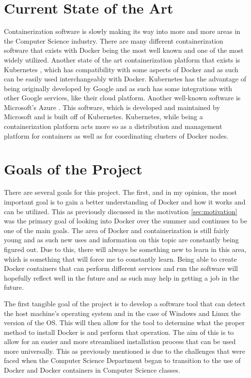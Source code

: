 \section{Current State of the Art}
\label{sec:stateofart}

Containerization software is slowly making its way into more and more areas in the Computer Science industry. There are many different containerization software that exists with Docker being the most well known and one of the most widely utilized. Another state of the art containerization platform that exists is Kubernetes \cite{kubernetes}, which has compatibility with some aspects of Docker and as such can be easily used interchangeably with Docker. Kubernetes has the advantage of being originally developed by Google and as such has some integrations with other Google services, like their cloud platform. Another well-known software is Microsoft's Azure \cite{azure}. This software, which is developed and maintained by Microsoft and is built off of Kubernetes. Kubernetes, while being a containerization platform acts more so as a distribution and management platform for containers as well as for coordinating clusters of Docker nodes.

\section{Goals of the Project}
\label{sec:goals}

There are several goals for this project. The first, and in my opinion, the most important goal is to gain a better understanding of Docker and how it works and can be utilized. This as previously discussed in the motivation \ref{sec:motivation} was the primary goal of looking into Docker over the summer and continues to be one of the main goals. The area of Docker and containerization is still fairly young and as such new uses and information on this topic are constantly being figured out. Due to this, there will always be something new to learn in this area, which is something that will force me to constantly learn. Being able to create Docker containers that can perform different services and run the software will hopefully reflect well in the future and as such may help in getting a job in the future.

The first tangible goal of the project is to develop a software tool that can detect the host machine's operating system and in the case of Windows and Linux the version of the OS. This will then allow for the tool to determine what the proper method to install Docker is and perform that operation. The aim of this is to allow for an easier and more streamlined installation process that can be used more universally. This as previously mentioned is due to the challenges that were faced when the Computer Science Department began to transition to the use of Docker and Docker containers in Computer Science classes.

